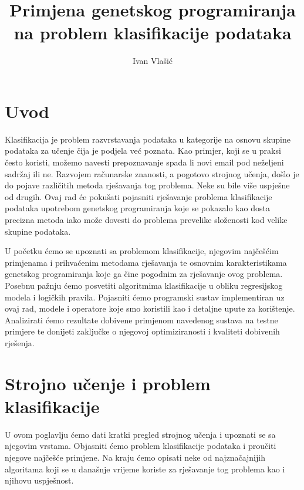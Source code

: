 \documentclass[times, utf8, zavrsni]{fer}
\begin{document}

\title{Primjena genetskog programiranja na problem klasifikacije podataka}

\author{Ivan Vlašić}

\maketitle

\izvornik

\zahvala{}

\tableofcontents

\chapter{Uvod}
Klasifikacija je problem razvrstavanja podataka u kategorije na osnovu skupine podataka za učenje čija je podjela već poznata. Kao primjer, koji se u praksi često koristi, možemo navesti prepoznavanje spada li novi email pod neželjeni sadržaj ili ne. Razvojem računarske znanosti, a pogotovo strojnog učenja, došlo je do pojave različitih metoda rješavanja tog problema. Neke su bile više uspješne od drugih. Ovaj rad će pokušati pojasniti rješavanje problema klasifikacije podataka upotrebom genetskog programiranja koje se pokazalo kao dosta precizna metoda iako može dovesti do problema prevelike složenosti kod velike skupine podataka.

U početku ćemo se upoznati sa problemom klasifikacije, njegovim najčešćim primjenama i prihvaćenim metodama rješavanja te osnovnim karakteristikama genetskog programiranja koje ga čine pogodnim za rješavanje ovog problema. Posebnu pažnju ćemo posvetiti algoritmima klasifikacije u obliku regresijskog modela i logičkih pravila. Pojasniti ćemo programski sustav implementiran uz ovaj rad, modele i operatore koje smo koristili kao i detaljne upute za korištenje. Analizirati ćemo rezultate dobivene primjenom navedenog sustava na testne primjere te donijeti zaključke o njegovoj optimiziranosti i kvaliteti dobivenih rješenja.

\chapter{Strojno učenje i problem klasifikacije}
U ovom poglavlju ćemo dati kratki pregled strojnog učenja i upoznati se sa njegovim vrstama. Objasniti ćemo problem klasifikacije podataka i proučiti njegove najčešće primjene. Na kraju ćemo opisati neke od najznačajnijih algoritama koji se u današnje vrijeme koriste za rješavanje tog problema kao i njihovu uspješnost.
\end{document}

